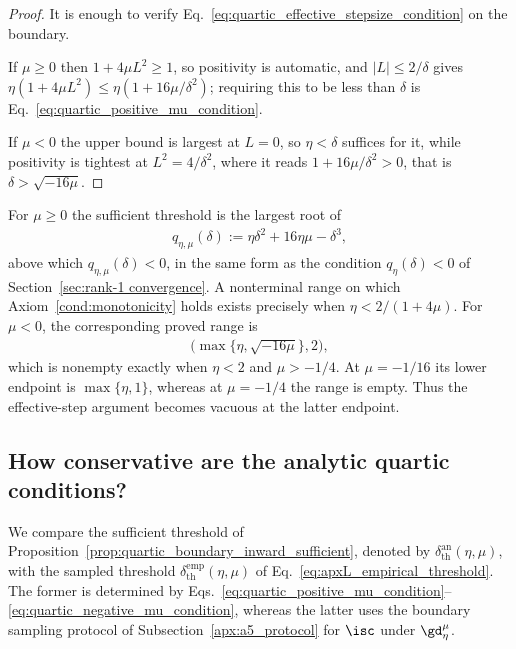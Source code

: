\documentclass{article}
\begin{document}
\begin{proof}
It is enough to verify
Eq.~\eqref{eq:quartic_effective_stepsize_condition} on the boundary.

If $\mu\ge0$ then $1+4\mu L^2\ge1$, so positivity is automatic, and
$|L|\le2/\delta$ gives
$\eta(1+4\mu L^2)\le\eta(1+16\mu/\delta^2)$; requiring this to be less than
$\delta$ is Eq.~\eqref{eq:quartic_positive_mu_condition}.

If $\mu<0$ the upper bound is largest at $L=0$, so $\eta<\delta$ suffices for
it, while positivity is tightest at $L^2=4/\delta^2$, where it reads
$1+16\mu/\delta^2>0$, that is $\delta>\sqrt{-16\mu}$.
\end{proof}

For $\mu\ge0$ the sufficient threshold is the largest root of
\begin{align}
q_{\eta,\mu}(\delta)
:=
\eta\delta^2+16\eta\mu-\delta^3,
\end{align}
above which $q_{\eta,\mu}(\delta)<0$, in the same form as the condition
$q_\eta(\delta)<0$ of Section~\ref{sec:rank-1 convergence}. A nonterminal
range on which Axiom~\ref{cond:monotonicity} holds exists precisely when
$\eta<2/(1+4\mu)$. For $\mu<0$, the corresponding proved range is
\begin{align}
\bigl(\max\{\eta,\sqrt{-16\mu}\},2\bigr),
\end{align}
which is nonempty exactly when $\eta<2$ and $\mu>-1/4$. At $\mu=-1/16$ its
lower endpoint is $\max\{\eta,1\}$, whereas at $\mu=-1/4$ the range is empty.
Thus the effective-step argument becomes vacuous at the latter endpoint.

\subsection{How conservative are the analytic quartic conditions?}
\label{subsec:quartic_conservativeness}
\label{apx:isc_quartic_experiment}%

We compare the sufficient threshold of
Proposition~\ref{prop:quartic_boundary_inward_sufficient}, denoted by
$\delta_{\mathrm{th}}^{\mathrm{an}}(\eta,\mu)$, with the sampled threshold
$\delta_{\mathrm{th}}^{\mathrm{emp}}(\eta,\mu)$ of
Eq.~\eqref{eq:apxL_empirical_threshold}. The former is determined by
Eqs.~\eqref{eq:quartic_positive_mu_condition}--\eqref{eq:quartic_negative_mu_condition},
whereas the latter uses the boundary sampling protocol of
Subsection~\ref{apx:a5_protocol} for $\isc$ under $\gd_\eta^\mu$.
\end{document}

